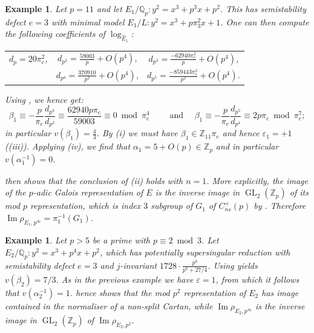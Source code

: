 \documentclass{amsart}
\newcommand{\op}[1]{\operatorname{#1}}
\newcommand{\Qp}{\mathbb{Q}_p}
\newtheorem{example}[theorem]{Example}
\theoremstyle{definition}
\newcommand{\Z}{\mathbb{Z}}
\newcommand{\Q}{\mathbb{Q}}
\newcommand{\GL}{\operatorname{GL}}
\numberwithin{theorem}{section}
\numberwithin{equation}{section}
\begin{document}
\begin{example}
Let $p=11$ and let $E_1/\Q_{p}: y^2=x^3+p^3x+p^2$. This has semistability defect $e=3$ with minimal model $E_1/L: y^2=x^3+p\pi_3^2x+1$. One can then compute the following coefficients of $\log_{\hat{E}_1}$:
    \begin{center}
      \begin{tabular}{ccc}
        $ d_{p} = 20\pi_e^2$, & $d_{p^2}= \frac{59003}{p} + O(p^4)$, & $d_{p^3}= \frac{-62940\pi_e^2}{p} + O(p^4)$, \\
         & $d_{p^4}= \frac{370910}{p^2} + O(p^4)$, & $d_{p^5}= \frac{-859443\pi_e^2}{p^2} + O(p^4)$.
    \end{tabular}   
    \end{center}
    Using , we hence get:
    \[
    \beta_1 \equiv -\frac{p}{\pi_e} \frac{d_{p^3}}{d_{p^2}} \equiv \frac{62940p\pi_e}{59003} \equiv 0 \bmod{\pi_e^4} \qquad \text{ and } \quad \beta_1 \equiv -\frac{p}{\pi_e} \frac{d_{p^5}}{d_{p^4}} \equiv 2p\pi_e \bmod{\pi_e^7};
    \]
    in particular $v(\beta_1)=\frac{4}{3}$. By (i) we must have $\beta_1 \in \mathbb{Z}_{11} \pi_e$ and hence $\varepsilon_1=+1$ ((iii)). Applying (iv), we find that $\alpha_1 = 5 + O(p) \in \Z_p$ and in particular $v(\alpha_1^{-1})=0$. 

     then shows that the conclusion of (ii) holds with $n=1$. More explicitly, the image of the $p$-adic Galois representation of $E$ is the inverse image in $\GL_2(\Z_p)$ of its mod $p$ representation, which is index $3$ subgroup of $G_1$ of $C_{ns}^+(p)$ by . Therefore $\op{Im} \rho_{E_1,p^{\infty}} = \pi_1^{-1}(G_1)$.
\end{example}


\begin{example}
Let $p>5$ be a prime with $p \equiv 2 \bmod{3}$. Let $E_2/\Qp : y^2 = x^3 + p^4 x + p^2$, which has potentially supersingular reduction with semistability defect $e=3$ and $j$-invariant $1728 \cdot \frac{p^8}{p^8 + 27/4}$. Using  yields $v(\beta_2)=7/3$. As in the previous example we have $\varepsilon=1$, from which it follows that $v(\alpha_2^{-1})=1$.  hence shows that the mod $p^2$ representation of $E_2$ has image contained in the normaliser of a non-split Cartan, while $\operatorname{Im} \rho_{E_2, p^\infty}$ is the inverse image in $\GL_2(\Z_p)$ of $\operatorname{Im} \rho_{E_2, p^2}$.
\end{example}
\end{document}
